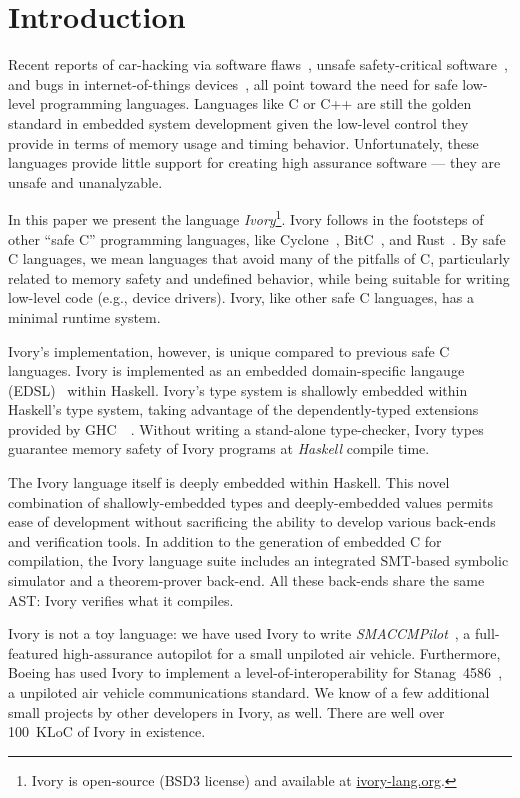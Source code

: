 \section{Introduction}
\label{sec:introduction}

Recent reports of car-hacking via software flaws~\cite{}, unsafe
safety-critical software~\cite{}, and bugs in internet-of-things
devices~\cite{}, all point toward the need for safe low-level programming
languages. Languages like C or C++ are still the golden standard in embedded
system development given the low-level control they provide in terms of memory
usage and timing behavior. Unfortunately, these languages provide
little support for creating high assurance software --- they are
unsafe and unanalyzable.

In this paper we present the language \emph{Ivory}\footnote{%
Ivory is open-source (BSD3 license) and available at \url{ivory-lang.org}.}.
Ivory follows in the
footsteps of other ``safe C'' programming languages, like
Cyclone~\cite{cyclone}, BitC~\cite{bitc}, and Rust~\cite{rust}. By safe C
languages, we mean languages that avoid many of the pitfalls of C, particularly
related to memory safety and undefined behavior, while being suitable for
writing low-level code (e.g., device drivers). Ivory, like other safe C
languages, has a minimal runtime system.

Ivory's implementation, however, is unique compared to previous safe C
languages. Ivory is implemented as an embedded domain-specific langauge
(EDSL)~\cite{edsl} within Haskell. Ivory's type system is shallowly embedded
within Haskell's type system, taking advantage of the dependently-typed extensions provided by
GHC~~\cite{dephaskell}. Without writing a stand-alone type-checker, Ivory types
guarantee memory safety of Ivory programs at \emph{Haskell} compile time.

The Ivory language itself is deeply embedded within Haskell.  This
novel combination of shallowly-embedded types and deeply-embedded
values permits ease of development without sacrificing the ability to
develop various back-ends and verification tools.  In addition to the
generation of embedded C for compilation, the Ivory language suite
includes an integrated SMT-based symbolic simulator and a
theorem-prover back-end.  All these back-ends share the same AST:
Ivory verifies what it compiles.

Ivory is not a toy language: we have used Ivory to write
\emph{SMACCMPilot}~\cite{smaccm}, a full-featured high-assurance
autopilot for a small unpiloted air vehicle.  Furthermore, Boeing has
used Ivory to implement a level-of-interoperability for
Stanag~4586~\cite{stanag}, a unpiloted air vehicle communications
standard. We know of a few additional small projects by other
developers in Ivory, as well.  There are well over 100~KLoC of Ivory in existence.

